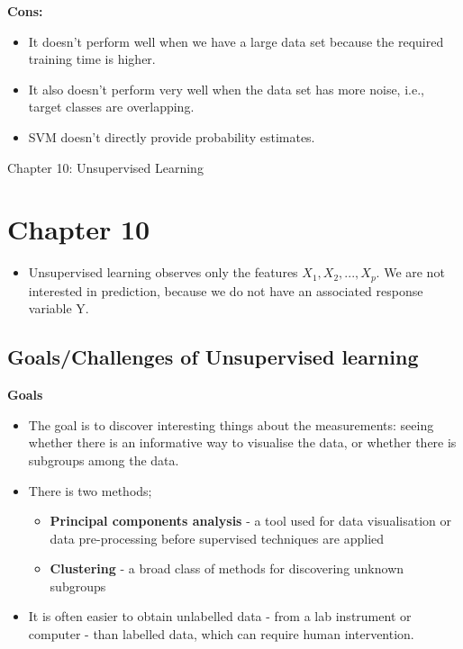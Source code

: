 \documentclass{article}
\begin{document}
\noindent \textbf{Cons:}
\begin{itemize}
  \item It doesn’t perform well when we have a large data set because the required training time is higher.
  \item It also doesn’t perform very well when the data set has more noise, i.e., target classes are overlapping.
  \item SVM doesn’t directly provide probability estimates.
\end{itemize}


\pagebreak
\begin{center}
    \Large{Chapter 10: Unsupervised Learning}
\end{center}

\section{Chapter 10}

\begin{itemize}
    \item Unsupervised learning observes only the features $X_1, X_2, ..., X_p$. We are not interested in prediction, because we do not have an associated response variable Y.
\end{itemize}

\subsection{Goals/Challenges of Unsupervised learning}


\noindent\textbf{Goals}
\begin{itemize}
    \item The goal is to discover interesting things about the measurements: seeing whether there is an informative way to visualise the data, or whether there is subgroups among the data.
    \item There is two methods;
    \begin{itemize}
        \item \textbf{Principal components analysis} - a tool used for data visualisation or data pre-processing before supervised techniques are applied
        \item \textbf{Clustering} - a broad class of methods for discovering unknown subgroups
    \end{itemize}
    \item It is often easier to obtain unlabelled data - from a lab instrument or computer - than labelled data, which can require human intervention.
\end{itemize}
\end{document}
